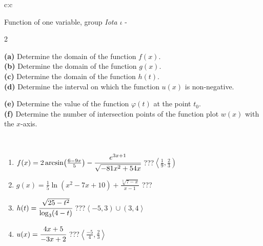 \documentclass[10pt]{report}
\begin{document}
\begin{tabular}{c:c}
\begin{minipage}[c][104.5mm][t]{0.5\linewidth}
\begin{center}
\vspace{7mm}
{\huge Function of one variable, group \textit{Iota $\iota$} -}\\[5mm]
\begin{minipage}{0.95\linewidth}
\begin{center}
{\small \begin{multicols}{2} \raggedright
\textbf{(a)} Determine the domain of the function \(f(x)\). \\[1mm]
\textbf{(b)} Determine the domain of the function \(g(x)\). \\[1mm]
\textbf{(c)} Determine the domain of the function \(h(t)\). \\[1mm]
\textbf{(d)} Determine the interval on which the function \(u(x)\) is non-negative. \par \columnbreak
\textbf{(e)} Determine the value of the function \(\varphi(t)\) at the point \(t_0\). \\[1mm]
\textbf{(f)} Determine the number of intersection points of the function plot \(w(x)\) with the \(x\)-axis. \\[1mm]
\end{multicols}
}
\end{center}
\end{minipage}
\\[4mm]
\begin{minipage}{0.79\linewidth}
\begin{center}
\begin{varwidth}{\linewidth}
\begin{enumerate}
\small
\item $f(x) = 2\arcsin\!\left( \frac{6-9x}{5} \right) - \cfrac{e^{3x+1}}{\sqrt{-81x^2+54x}}$\quad \dotfill\; ???\;\dotfill \quad $\left\langle\frac{1}{9} , \frac{2}{3}\right)$
\item $g(x) = \frac{1}{5} \ln{\!(x^2-7x+10)}+\frac{\sqrt[3]{7-x}}{x-1}$\quad \dotfill\; ???\;\dotfill {}
\item $h(t) = \cfrac{\sqrt{25-t^2}}{\log_3(4-t)}$\quad \dotfill\; ???\;\dotfill \quad $\left\langle-5 , 3\right)\cup\left(3 , 4\right\rangle$
\item $u(x) = \cfrac{4x+5}{-3x+2}$\quad \dotfill\; ???\;\dotfill \quad $\left\langle\frac{-5}{4} , \frac{2}{3}\right\rangle$

\end{enumerate}
\end{varwidth}
\end{center}
\end{minipage}
\end{center}
\end{minipage}
\end{tabular}
\end{document}
